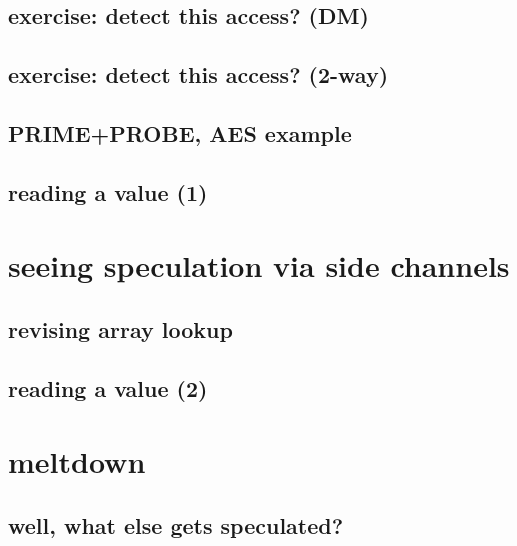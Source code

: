 

\subsection{exercise: detect this access? (DM)}

\subsection{exercise: detect this access? (2-way)}


\subsection{PRIME+PROBE, AES example}

\subsection{reading a value (1)}


\section{seeing speculation via side channels}

\subsection{revising array lookup}

 

\subsection{reading a value (2)}


\section{meltdown}

\subsection{well, what else gets speculated?}


